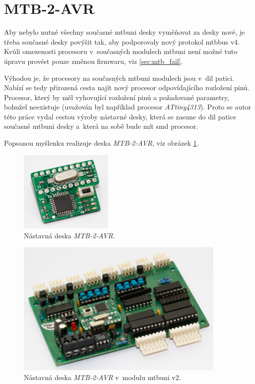 \newpage
\section{MTB-2-AVR} \label{sec:mtb-2-avr}

Aby nebylo nutné všechny současné \gls{mtbuni} desky vyměňovat za desky nové,
je třeba současné desky povýšit tak, aby podporovaly nový protokol \gls{mtbbus} v4.
Kvůli omezenosti procesoru v~současných modulech \gls{mtbuni} není možné tuto
úpravu provést pouze změnou firmwaru, viz \ref{sec:mtb_fail}.

Výhodou je, že procesory na současných \gls{mtbuni} modulech jsou
v~\gls{dil} patici. Nabízí se tedy přirozená cesta najít nový procesor
odpovídajícího rozložení pinů. Procesor, který by měl vyhovující rozložení pinů
a požadované parametry, bohužel neexistuje (uvažován byl například procesor
\textit{ATtiny4313}). Proto se autor této práce vydal cestou výroby nástavné
desky, která se zasune do \gls{dil} patice současné \gls{mtbuni} desky
a~která na sobě bude mít \gls{smd} procesor.

Popsanou myšlenku realizuje deska \textit{MTB-2-AVR}, viz obrázek
\ref{fig:mtb-2-avr-alone}.

\begin{figure}[ht]
\includegraphics[width=0.4\textwidth]{data/uni-2-upgrade-alone.jpg}
\caption{Nástavná deska \textit{MTB-2-AVR}.}
\label{fig:mtb-2-avr-alone}
\end{figure}

\begin{figure}[ht]
\includegraphics[width=0.9\textwidth]{data/uni-2-upgrade-all.jpg}
\caption{Nástavná deska \textit{MTB-2-AVR} v~modulu \gls{mtbuni} v2.}
\label{fig:mtb-2-avr-inside}
\end{figure}

